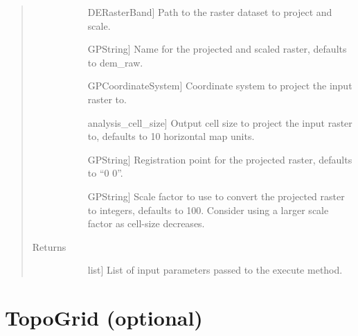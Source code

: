 \documentclass[letterpaper,10pt,english]{sphinxmanual}
\begin{document}
\begin{fulllineitems}
\begin{fulllineitems}
\begin{quote}
\begin{description}
\begin{description}
\item[{}] \leavevmode{[}DERasterBand{]}
Path to the raster dataset to project and scale.

\item[{}] \leavevmode{[}GPString{]}
Name for the projected and scaled raster, defaults to dem\_raw.

\item[{}] \leavevmode{[}GPCoordinateSystem{]}
Coordinate system to project the input raster to.

\item[{}] \leavevmode{[}analysis\_cell\_size{]}
Output cell size to project the input raster to, defaults to 10 horizontal map units.

\item[{}] \leavevmode{[}GPString{]}
Registration point for the projected raster, defaults to “0 0”.

\item[{}] \leavevmode{[}GPString{]}
Scale factor to use to convert the projected raster to integers, defaults to 100. Consider using a larger scale factor as cell-size decreases.

\end{description}

\item[{Returns}] \leavevmode\begin{description}
\item[{}] \leavevmode{[}list{]}
List of input parameters passed to the execute method.

\end{description}

\end{description}\end{quote}

\end{fulllineitems}


\end{fulllineitems}



\section{TopoGrid (optional)}
\label{\detokenize{StreamStats_DataPrep:topogrid-optional}}
\end{document}
